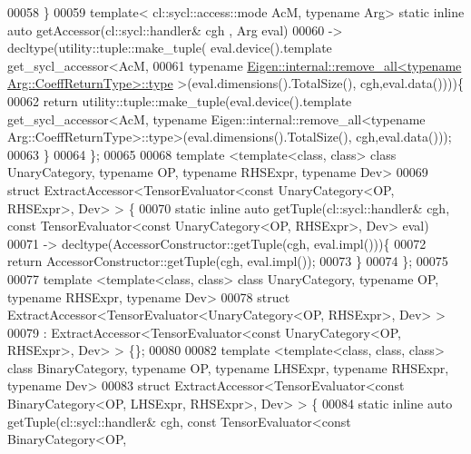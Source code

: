 \begin{DoxyCode}
00058   \}
00059   \textcolor{keyword}{template}< cl::sycl::access::mode AcM, \textcolor{keyword}{typename} Arg> \textcolor{keyword}{static} \textcolor{keyword}{inline} \textcolor{keyword}{auto} getAccessor(cl::sycl::handler& cgh
      , Arg eval)
00060   -> decltype(utility::tuple::make\_tuple( eval.device().template get\_sycl\_accessor<AcM,
00061   \textcolor{keyword}{typename} \hyperlink{group___sparse_core___module}{Eigen::internal::remove\_all<typename Arg::CoeffReturnType>::type}
      >(eval.dimensions().TotalSize(), cgh,eval.data())))\{
00062     \textcolor{keywordflow}{return} utility::tuple::make\_tuple(eval.device().template get\_sycl\_accessor<AcM, typename
       Eigen::internal::remove\_all<typename Arg::CoeffReturnType>::type>(eval.dimensions().TotalSize(), cgh,eval.data()));
00063   \}
00064 \};
00065 
00068 \textcolor{keyword}{template} <\textcolor{keyword}{template}<\textcolor{keyword}{class}, \textcolor{keyword}{class}> \textcolor{keyword}{class }UnaryCategory, \textcolor{keyword}{typename} OP, \textcolor{keyword}{typename} RHSExpr, \textcolor{keyword}{typename} Dev>
00069 \textcolor{keyword}{struct }ExtractAccessor<TensorEvaluator<const UnaryCategory<OP, RHSExpr>, Dev> > \{
00070   \textcolor{keyword}{static} \textcolor{keyword}{inline} \textcolor{keyword}{auto} getTuple(cl::sycl::handler& cgh, \textcolor{keyword}{const} TensorEvaluator<\textcolor{keyword}{const} UnaryCategory<OP,
       RHSExpr>, Dev> eval)
00071   -> decltype(AccessorConstructor::getTuple(cgh, eval.impl()))\{
00072     \textcolor{keywordflow}{return} AccessorConstructor::getTuple(cgh, eval.impl());
00073   \}
00074 \};
00075 
00077 \textcolor{keyword}{template} <\textcolor{keyword}{template}<\textcolor{keyword}{class}, \textcolor{keyword}{class}> \textcolor{keyword}{class }UnaryCategory, \textcolor{keyword}{typename} OP, \textcolor{keyword}{typename} RHSExpr, \textcolor{keyword}{typename} Dev>
00078 \textcolor{keyword}{struct }ExtractAccessor<TensorEvaluator<UnaryCategory<OP, RHSExpr>, Dev> >
00079 : ExtractAccessor<TensorEvaluator<const UnaryCategory<OP, RHSExpr>, Dev> > \{\};
00080 
00082 \textcolor{keyword}{template} <\textcolor{keyword}{template}<\textcolor{keyword}{class}, \textcolor{keyword}{class}, \textcolor{keyword}{class}> \textcolor{keyword}{class }BinaryCategory, \textcolor{keyword}{typename} OP,  \textcolor{keyword}{typename} LHSExpr, \textcolor{keyword}{typename} 
      RHSExpr, \textcolor{keyword}{typename} Dev>
00083 \textcolor{keyword}{struct }ExtractAccessor<TensorEvaluator<const BinaryCategory<OP, LHSExpr, RHSExpr>, Dev> > \{
00084   \textcolor{keyword}{static} \textcolor{keyword}{inline} \textcolor{keyword}{auto} getTuple(cl::sycl::handler& cgh, \textcolor{keyword}{const} TensorEvaluator<\textcolor{keyword}{const} BinaryCategory<OP,

\end{DoxyCode}
